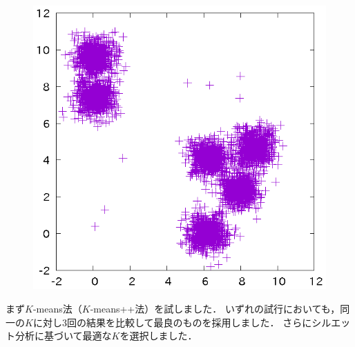 ﻿\documentclass{jsarticle}
\begin{document}
\begin{figure}[h]
\begin{center}
\begin{minipage}{.32\textwidth}
\begin{center}
 \end{center}
 \end{minipage}
 \begin{minipage}{.32\textwidth}
 \begin{center}
 \includegraphics[height=.18\textheight]{fig/src3.eps}
 \end{center}
 \end{minipage}
\end{center}
\end{figure}
まず$K$-means法（$K$-means++法）を試しました．
いずれの試行においても，同一の$K$に対し3回の結果を比較して最良のものを採用しました．
さらにシルエット分析に基づいて最適な$K$を選択しました．
\end{document}
